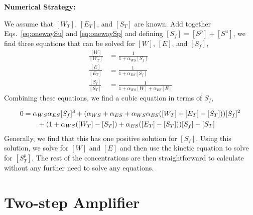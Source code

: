 \documentclass[aps,onecolumn,superscriptaddress,notitlepage]{revtex4-1}
\begin{document}
\textbf{Numerical Strategy:}

We assume that  $[W_T]$, $[E_T]$, and $[S_T]$ are known. 
Add together Eqs.~\eqref{eq:onewaySu} and \eqref{eq:onewaySp} and defining $[S_f] = [S^p]+[S^u]$, 
we find three equations that can be solved for $[W]$, $[E]$, and $[S_f]$,
\begin{align}
\frac{[W]}{[W_T]} & = \frac{1}{1 + \alpha_{WS}[S_f]}\\
\frac{[E]}{[E_T]} & = \frac{1}{1 + \alpha_{ES}[S_f]}\\
\frac{[S_f]}{[S_T]} &= \frac{1}{1 + \alpha_{WS}[W]+ \alpha_{ES}[E]}
\end{align}
Combining these equations, we find a cubic equation in terms of $S_f$,

\begin{align}
0 &= \alpha_{WS}\alpha_{ES}[S_f]^3 +\qty(\alpha_{WS}+\alpha_{ES} + \alpha_{WS}\alpha_{ES}([W_T]+[E_T]- [S_T])) [S_f]^2\\
&\qquad + \qty(1+\alpha_{WS}([W_T]-[S_T]) + \alpha_{ES}([E_T]-[S_T]))[S_f] - [S_T]
\end{align}
Generally, we find that this has one positive solution for $[S_f]$. 
Using this solution, we solve for $[W]$ and $[E]$ and then use the kinetic equation to solve for $[S_T^p]$. The rest of the concentrations are then straightforward to calculate without any further need to solve any equations.



%
%
%
%
%
%


\section{Two-step Amplifier}
\end{document}
